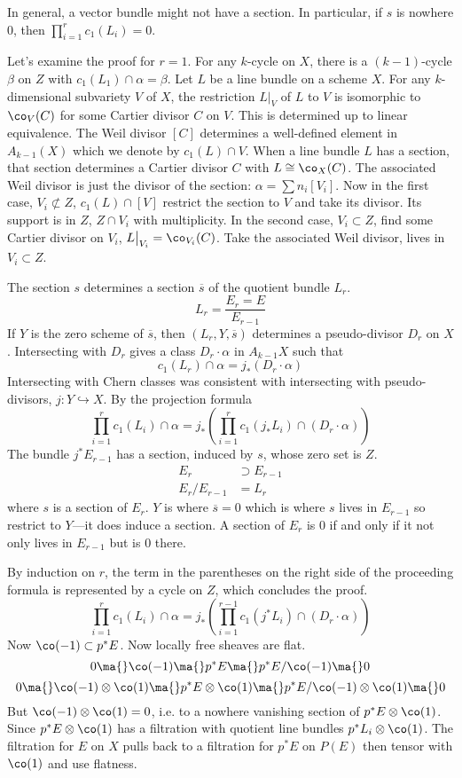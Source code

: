 In general, a vector bundle might not have a section. In particular, if $s$ is nowhere 0, then $\prod_{i=1}^r c_1(L_i)=0$.

Let's examine the proof for $r=1$. For any $k$-cycle on $X$, there is a $(k-1)$-cycle $\beta$ on $Z$ with $c_1(L_1) \cap \alpha=\beta$. Let $L$ be a line bundle on a scheme $X$. For any $k$-dimensional subvariety $V$ of $X$, the restriction $L\big|_V$ of $L$ to $V$ is isomorphic to $\co_V(C)$ for some Cartier divisor $C$ on $V$. This is determined up to linear equivalence. The Weil divisor $[C]$ determines a well-defined element in $A_{k-1}(X)$ which we denote by $c_1(L) \cap V$. When a line bundle $L$ has a section, that section determines a Cartier divisor $C$ with $L \cong \co_X(C)$. The associated Weil divisor is just the divisor of the section: $\alpha= \sum n_i[V_i]$. Now in the first case, $V_i \not\subset Z$, $c_1(L) \cap [V]$ restrict the section to $V$ and take its divisor. Its support is in $Z$, $Z \cap V_i$ with multiplicity. In the second case, $V_i \subset Z$, find some Cartier divisor on $V_i$, $L \big|_{V_i}=\co_{V_i}(C)$. Take the associated Weil divisor, lives in $V_i \subset Z$. 


The section $s$ determines a section $\overline{s}$ of the quotient bundle $L_r$. 
	\[
	L_r= \dfrac{E_r=E}{E_{r-1}}
	\]
If $Y$ is the zero scheme of $\overline{s}$, then $(L_r,Y,\overline{s})$ determines a pseudo-divisor $D_r$ on $X$. Intersecting with $D_r$ gives a class $D_r \cdot \alpha$ in $A_{k-1}X$ such that
	\[
	c_1(L_r) \cap \alpha= j_*(D_r \cdot \alpha)
	\] 
Intersecting with Chern classes was consistent with intersecting with pseudo-divisors, $j: Y \hookrightarrow X$. By the projection formula
	\[
	\prod_{i=1}^r c_1(L_i) \cap \alpha = j_*(\prod_{i=1}^r c_1(j_* L_i) \cap (D_r \cdot \alpha))
	\]
The bundle $j^*E_{r-1}$ has a section, induced by $s$, whose zero set is $Z$.
	\[
	\begin{split}
	E_r &\supset E_{r-1} \\
	E_r/E_{r-1}&=L_r
	\end{split}
	\]
where $s$ is a section of $E_r$. $Y$ is where $\overline{s}=0$ which is where $s$ lives in $E_{r-1}$ so restrict to $Y$---it does induce a section. A section of $E_r$ is 0 if and only if it not only lives in $E_{r-1}$ but is 0 there.

By induction on $r$, the term in the parentheses on the right side of the proceeding formula is represented by a cycle on $Z$, which concludes the proof.
	\[
	\prod_{i=1}^r c_1(L_i) \cap \alpha = j_*\left(\prod_{i=1}^{r-1} c_1(j^*L_i) \cap (D_r \cdot \alpha)\right)
	\]
Now $\co(-1) \subset p^*E$. Now locally free sheaves are flat. 
	\[
	0 \ma{} \co(-1) \ma{} p^*E \ma{} p^*E/\co(-1) \ma{} 0
	\]
	\[
	0 \ma{} \co(-1) \otimes \co(1) \ma{} p^*E \otimes \co(1) \ma{} p^*E/\co(-1) \otimes \co(1) \ma{} 0
	\]
But $\co(-1) \otimes \co(1)=0$, i.e. to a nowhere vanishing section of $p^*E \otimes \co(1)$. Since $p^*E \otimes \co(1)$ has a filtration with quotient line bundles $p^*L_i \otimes \co(1)$. The filtration for $E$ on $X$ pulls back to a filtration for $p^*E$ on $P(E)$ then tensor with $\co(1)$ and use flatness. 


